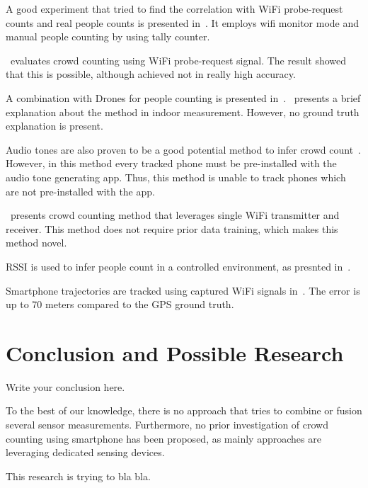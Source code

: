 \documentclass{article}
\begin{document}
A good experiment that tried to find the correlation with WiFi probe-request counts and real people counts is presented in~\cite{thesis047}. It employs wifi monitor mode and manual people counting by using tally counter.

\cite{thesis057}~evaluates crowd counting using WiFi probe-request signal. The result showed that this is possible, although achieved not in really high accuracy.

A combination with Drones for people counting is presented in~\cite{thesis053}. \cite{thesis060}~presents a brief explanation about the method in indoor measurement. However, no ground truth explanation is present.

Audio tones are also proven to be a good potential method to infer crowd count~\cite{thesis044}. However, in this method every tracked phone must be pre-installed with the audio tone generating app. Thus, this method is unable to track phones which are not pre-installed with the app.

\cite{thesis051}~presents crowd counting method that leverages single WiFi transmitter and receiver. This method does not require prior data training, which makes this method novel.

RSSI is used to infer people count in a controlled environment, as presnted in~\cite{thesis052}. 

Smartphone trajectories are tracked using captured WiFi signals in~\cite{thesis058}. The error is up to 70 meters compared to the GPS ground truth.

\cite{thesis048}


\section{Conclusion and Possible Research}
Write your conclusion here.

To the best of our knowledge, there is no approach that tries to combine or fusion several sensor measurements. Furthermore, no prior investigation of crowd counting using smartphone has been proposed, as mainly approaches are leveraging dedicated sensing devices.

This research is trying to bla bla.

{}

\end{document}
